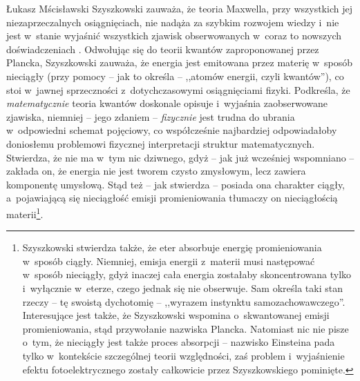 \begin{artplenv}{Łukasz Mścisławski}
Szyszkowski zauważa, że teoria Maxwella, przy wszystkich jej niezaprzeczalnych osiągnięciach, nie nadąża za szybkim rozwojem wiedzy i~nie jest w~stanie wyjaśnić wszystkich zjawisk obserwowanych w~coraz to nowszych doświadczeniach
\parencite[por.][s.~53]{szyszkowski_o_1916}. %
 Odwołując się do teorii kwantów zaproponowanej przez Plancka, Szyszkowski zauważa, że energia jest emitowana przez materię w~sposób nieciągły (przy pomocy -- jak to określa -- ,,atomów energii, czyli kwantów''), co stoi w~jawnej sprzeczności z~dotychczasowymi osiągnięciami fizyki. Podkreśla, że \textit{matematycznie} teoria kwantów doskonale opisuje i~wyjaśnia zaobserwowane zjawiska, niemniej -- jego zdaniem -- \textit{fizycznie} jest trudna do ubrania w~odpowiedni schemat pojęciowy, co współcześnie najbardziej odpowiadałoby doniosłemu problemowi fizycznej interpretacji struktur matematycznych. Stwierdza, że nie ma w~tym nic dziwnego, gdyż -- jak już wcześniej wspomniano -- zakłada on, że energia nie jest tworem czysto zmysłowym, lecz zawiera komponentę umysłową. Stąd też -- jak stwierdza -- posiada ona charakter ciągły, a~pojawiającą się nieciągłość emisji promieniowania tłumaczy on nieciągłością materii\footnote{Szyszkowski stwierdza także, że eter absorbuje energię promieniowania w~sposób ciągły. Niemniej, emisja energii z~materii musi następować w~sposób nieciągły, gdyż inaczej cała energia zostałaby skoncentrowana tylko i~wyłącznie w~eterze, czego jednak się nie obserwuje. Sam określa taki stan rzeczy -- tę swoistą dychotomię -- ,,wyrazem instynktu samozachowawczego''. Interesujące jest także, że Szyszkowski wspomina o~skwantowanej emisji promieniowania, stąd przywołanie nazwiska Plancka. Natomiast nic nie pisze o~tym, że nieciągły jest także proces absorpcji -- nazwisko Einsteina pada tylko w~kontekście szczególnej teorii względności, zaś problem i~wyjaśnienie efektu fotoelektrycznego  
\parencite[por.][]{einstein_uber_1905} %
 zostały całkowicie przez Szyszkowskiego pominięte.}.


\end{artplenv}
